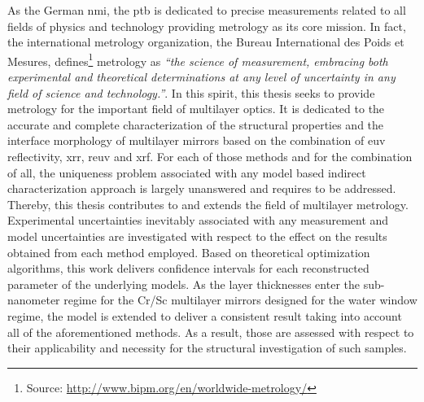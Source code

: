 As the German \gls{nmi}, the \gls{ptb} is dedicated to precise measurements related to all fields of physics and technology providing metrology as its core mission. In fact, the international metrology organization, the Bureau International des Poids et Mesures, defines\footnote{Source: \url{http://www.bipm.org/en/worldwide-metrology/}} metrology as \emph{``the science of measurement, embracing both experimental and theoretical determinations at any level of uncertainty in any field of science and technology.''}. In this spirit, this thesis seeks to provide metrology for the important field of multilayer optics. It is dedicated to the accurate and complete characterization of the structural properties and the interface morphology of multilayer mirrors based on the combination of \gls{euv} reflectivity, \gls{xrr}, \gls{reuv} and \gls{xrf}. For each of those methods and for the combination of all, the uniqueness problem associated with any model based indirect characterization approach is largely unanswered and requires to be addressed. Thereby, this thesis contributes to and extends the field of multilayer metrology.
Experimental uncertainties inevitably associated with any measurement and model uncertainties are investigated with respect to the effect on the results obtained from each method employed. Based on theoretical optimization algorithms, this work delivers confidence intervals for each reconstructed parameter of the underlying models. As the layer thicknesses enter the sub-nanometer regime for the Cr/Sc multilayer mirrors designed for the water window regime, the model is extended to deliver a consistent result taking into account all of the aforementioned methods. As a result, those are assessed with respect to their applicability and necessity for the structural investigation of such samples.

